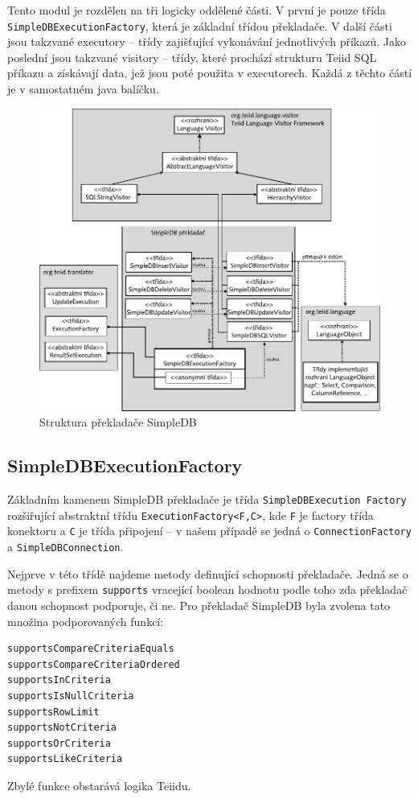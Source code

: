 \documentclass[oneside,12pt,final]{fithesis2}
\begin{document}
Tento modul je rozdělen na tři logicky oddělené části. V první je pouze třída \texttt{SimpleDBExecutionFactory}, která je základní třídou překladače. V další části jsou takzvané executory -- třídy zajišťující vykonávání jednotlivých příkazů. Jako poslední jsou takzvané visitory -- třídy, které prochází strukturu Teiid SQL příkazu a získávají data, jež jsou poté použita v executorech. Každá z těchto částí je v samostatném java balíčku.
\begin{figure}[h]
 \centering
 \includegraphics[scale=0.8]{TranslatorStructure}
 \caption{Struktura překladače SimpleDB}
\end{figure}
\subsection{SimpleDBExecutionFactory}
Základním kamenem SimpleDB překladače je třída \texttt{SimpleDBExecution Factory} rozšiřující abstraktní třídu \texttt{ExecutionFactory<F,C>}, kde \texttt{F} je factory třída konektoru a \texttt{C} je třída připojení -- v našem případě se jedná o \texttt{ConnectionFactory} a \texttt{SimpleDBConnection}.

Nejprve v této třídě najdeme metody definující schopnosti překladače. Jedná se o metody s prefixem \texttt{supports} vracející boolean hodnotu podle toho zda překladač danou schopnost podporuje, či ne. Pro překladač SimpleDB byla zvolena tato množina podporovaných funkcí: 
\begin{verbatim}
supportsCompareCriteriaEquals
supportsCompareCriteriaOrdered
supportsInCriteria
supportsIsNullCriteria
supportsRowLimit
supportsNotCriteria
supportsOrCriteria
supportsLikeCriteria
\end{verbatim}
Zbylé funkce obstarává logika Teiidu.
\end{document}
